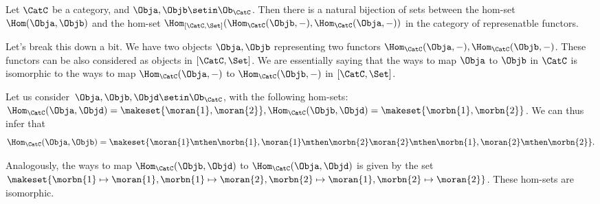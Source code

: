 \begin{theorem}
    Let $\CatC$ be a category, and $\Obja, \Objb \setin \Ob_\CatC$.
    Then there is a natural bijection of sets between the hom-set $\Hom(\Obja,\Objb)$ and the hom-set $\Hom_{[\CatC, \Set]}(\Hom_\CatC(\Objb, -), \Hom_\CatC(\Obja, -))$ in the category of represenatble functors.
\end{theorem}
Let's break this down a bit.
We have two objects $\Obja, \Objb$ representing two functors $\Hom_\CatC(\Obja,-), \Hom_\CatC(\Objb,-)$.
These functors can be also considered as objects in $[\CatC, \Set]$.
We are essentially saying that the ways to map $\Obja$ to $\Objb$ in $\CatC$ is isomorphic to the ways to map $\Hom_\CatC(\Obja,-)$ to $ \Hom_\CatC(\Objb,-)$ in $[\CatC, \Set]$.

\begin{example}
    \begin{marginfigure}
        \centering
        \caption{}
        \label{fig:rep-functor-1}
    \end{marginfigure}

    \begin{marginfigure}
        \centering
        \caption{}
        \label{fig:rep-functor-2}
    \end{marginfigure}
    Let us consider~$\Obja, \Objb, \Objd \setin \Ob_\CatC$, with the following hom-sets: $\Hom_\CatC(\Obja, \Objd) = \makeset{\moran{1},\moran{2}}, \Hom_\CatC(\Objb, \Objd) = \makeset{\morbn{1},\morbn{2}}$.
    We can thus infer that
    $$\Hom_\CatC(\Obja, \Objb) = \makeset{\moran{1}\mthen\morbn{1}, \moran{1}\mthen\morbn{2} \moran{2}\mthen\morbn{1}, \moran{2}\mthen\morbn{2}}.
    $$

    Analogously, the ways to map $\Hom_\CatC(\Objb, \Objd)$ to $\Hom_\CatC(\Obja, \Objd)$ is given by the set $\makeset{\morbn{1} \mapsto \moran{1}, \morbn{1} \mapsto \moran{2}, \morbn{2} \mapsto \moran{1}, \morbn{2} \mapsto \moran{2}}$.
    These hom-sets are isomorphic.
\end{example}

